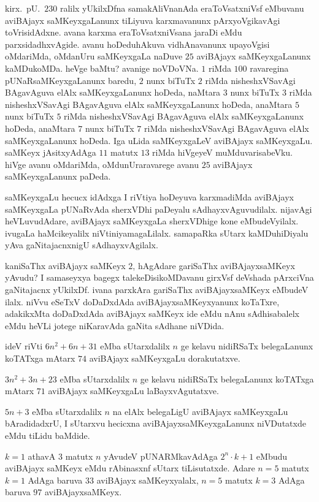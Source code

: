 kirx.~pU.\ $230$ ralilx yUkilxDfna samakAliVnanAda eraToVsatxniVsf eMbuvanu aviBAjayx saMKeyxgaLanunx tiLiyuva karxmavanunx pArxyoVgikavAgi toVrisidAdxne. avana karxma eraToVsatxniVsana jaraDi eMdu parxsidadhxvAgide. avanu hoDeduhAkuva vidhAna\-vanunx upayoVgisi oMdariMda, oMdanUru saMKeyxgaLa naDuve $25$ aviBAjayx saMKeyxgaLanunx kaMDukoMDa. heVge baMtu? avanige noVDoVNa. $1$ riMda $100$ ravaregina pUNaRsaMKeyxgaLanunx baredu, $2$ nunx biTuTx $2$ riMda nisheshxVSavAgi BAgavAguva elAlx saMKeyxgaLanunx hoDeda, naMtara $3$ nunx biTuTx $3$ riMda nisheshxVSavAgi BAgavAguva elAlx saMKeyxgaLanunx hoDeda, anaMtara $5$ nunx biTuTx $5$ riMda nisheshxVSavAgi BAgavAguva elAlx saMKeyxgaLanunx hoDeda, anaMtara $7$ nunx biTuTx $7$ riMda nisheshxVSavAgi BAgavAguva elAlx saMKeyxgaLanunx hoDeda. Iga uLida saMKeyxgaLeV aviBAjayx saMKeyxgaLu. saMKeyx jAsitxyAdAga $11$ matutx $13$ riMda hiVgeyeV muMduvarisabeVku. hiVge avanu oMdariMda, oMdunUraravarege avanu $25$ aviBAjayx saMKeyxgaLanunx paDeda.

saMKeyxgaLu hecucx idAdxga I riVtiya hoDeyuva karxmadiMda aviBAjayx saMKeyxgaLa pUNaRvAda sherxVDhi paDeyalu sAdhayxvAguvudilalx. nijavAgi heVLuvudAdare, aviBAjayx saMKeyxgaLa sherxVDhige kone eMbudeVyilalx. ivugaLa haMcikeyalilx niVtiniyamagaLilalx. samapaRka sUtarx kaMDuhiDiyalu yAva gaNitajacnxnigU sAdhayxvAgilalx. 

kaniSaThx aviBAjayx saMKeyx $2$, hAgAdare gariSaThx aviBAjayxsaMKeyx yAvudu? I samaseyxya bagegx talekeDisikoMDavanu girxVsf deVshada pArxciVna gaNitajacnx yUkilxDf. ivana parxkAra gariSaThx aviBAjayxsaMKeyx eMbudeV ilalx. niVvu eSeTxV doDaDxdAda aviBAjayxsaMKeyxyanunx koTaTxre, adakikxMta doDaDxdAda aviBAjayx saMKeyx ide eMdu nAnu sAdhisabalelx eMdu heVLi jotege niKaravAda gaNita sAdhane niVDida.

ideV riVti $6n^2+6n+31$ eMba sUtarxdalilx $n$ ge kelavu nidiRSaTx belegaLanunx koTATxga mAtarx $74$ aviBAjayx saMKeyxgaLu dorakutatxve.

$3n^2+3n+23$ eMba sUtarxdalilx $n$ ge kelavu nidiRSaTx belegaLanunx koTATxga mAtarx $71$ aviBAjayx saMKeyxgaLu laBayxvAgutatxve.

$5n+3$ eMba sUtarxdalilx $n$ na elAlx belegaLigU aviBAjayx saMKeyxgaLu bAradidadxrU, I sUtarxvu hecicxna aviBAjayxsaMKeyxgaLanunx niVDutatxde eMdu tiLidu baMdide.

$k=1$ athavA $3$ matutx $n$ yAvudeV pUNARMkavAdAga $2^{n}\cdot k+1$ eMbudu aviBAjayx saMKeyx eMdu rAbinasxnf sUtarx tiLisutatxde. Adare $n=5$ matutx $k=1$ AdAga baruva $33$ aviBAjayx saMKeyxyalalx, $n=5$ matutx $k=3$ AdAga baruva $97$ aviBAjayxsaMKeyx.

